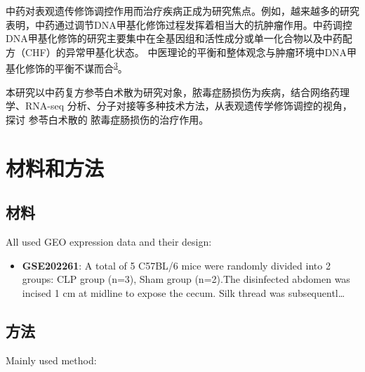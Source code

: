 \documentclass[
]{article}
\providecommand{\tightlist}{%
  \setlength{\itemsep}{0pt}\setlength{\parskip}{0pt}}
\begin{document}
中药对表观遗传修饰调控作用而治疗疾病正成为研究焦点。例如，越来越多的研究表明，中药通过调节DNA甲基化修饰过程发挥着相当大的抗肿瘤作用。中药调控DNA甲基化修饰的研究主要集中在全基因组和活性成分或单一化合物以及中药配方（CHF）的异常甲基化状态。 中医理论的平衡和整体观念与肿瘤环境中DNA甲基化修饰的平衡不谋而合\textsuperscript{\protect\hyperlink{ref-TraditionalChiZhuD2022}{3}}。

本研究以中药复方参苓白术散为研究对象，脓毒症肠损伤为疾病，结合网络药理学、RNA-seq 分析、分子对接等多种技术方法，从表观遗传学修饰调控的视角，探讨 参苓白术散的 脓毒症肠损伤的治疗作用。

\hypertarget{methods}{%
\section{材料和方法}\label{methods}}

\hypertarget{ux6750ux6599}{%
\subsection{材料}\label{ux6750ux6599}}

All used GEO expression data and their design:

\begin{itemize}
\tightlist
\item
  \textbf{GSE202261}: A total of 5 C57BL/6 mice were randomly divided into 2 groups: CLP group (n=3), Sham group (n=2).The disinfected abdomen was incised 1 cm at midline to expose the cecum. Silk thread was subsequentl\ldots{}
\end{itemize}

\hypertarget{ux65b9ux6cd5}{%
\subsection{方法}\label{ux65b9ux6cd5}}

Mainly used method:
\end{document}
